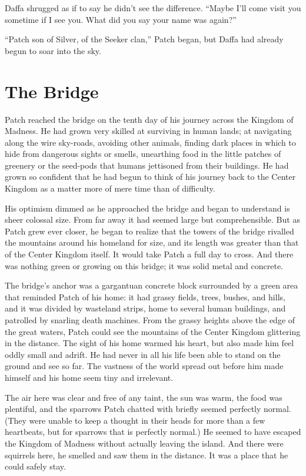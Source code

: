\documentclass[ebook,oneside,openany,12pt]{memoir}
\begin{document}
Daffa shrugged as if to say he didn’t see the difference. “Maybe I’ll
come visit you sometime if I see you. What did you say your name was
again?”

“Patch son of Silver, of the Seeker clan,” Patch began, but Daffa had
already begun to soar into the sky.


\section{The Bridge}

Patch reached the bridge on the tenth day of his journey across the
Kingdom of Madness. He had grown very skilled at surviving in human
lands; at navigating along the wire sky-roads, avoiding other animals,
finding dark places in which to hide from dangerous sights or smells,
unearthing food in the little patches of greenery or the seed-pods
that humans jettisoned from their buildings. He had grown so confident
that he had begun to think of his journey back to the Center Kingdom
as a matter more of mere time than of difficulty.

His optimism dimmed as he approached the bridge and began to
understand is sheer colossal size. From far away it had seemed large
but comprehensible. But as Patch grew ever closer, he began to realize
that the towers of the bridge rivalled the mountains around his
homeland for size, and its length was greater than that of the Center
Kingdom itself. It would take Patch a full day to cross. And there was
nothing green or growing on this bridge; it was solid metal and
concrete.

The bridge’s anchor was a gargantuan concrete block surrounded by a
green area that reminded Patch of his home: it had grassy fields,
trees, bushes, and hills, and it was divided by wasteland strips, home
to several human buildings, and patrolled by snarling death
machines. From the grassy heights above the edge of the great waters,
Patch could see the mountains of the Center Kingdom glittering in the
distance. The sight of his home warmed his heart, but also made him
feel oddly small and adrift. He had never in all his life been able to
stand on the ground and see so far. The vastness of the world spread
out before him made himself and his home seem tiny and irrelevant.

The air here was clear and free of any taint, the sun was warm, the
food was plentiful, and the sparrows Patch chatted with briefly seemed
perfectly normal. (They were unable to keep a thought in their heads
for more than a few heartbeats, but for sparrows that is perfectly
normal.) He seemed to have escaped the Kingdom of Madness without
actually leaving the island. And there were squirrels here, he smelled
and saw them in the distance. It was a place that he could safely
stay.
\end{document}
